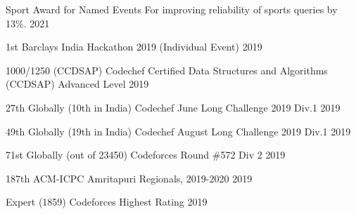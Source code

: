 \begin{cvhonors}

\cvhonor
{Sport Award for Named Events} %
{For improving reliability of sports queries by 13\%.} %
{} %
{2021} %


\cvhonor
{1st} %
{Barclays India Hackathon 2019 (Individual Event)} %
{} %
{2019} %


\cvhonor
{1000/1250 (CCDSAP)} %
{Codechef Certified Data Structures and Algorithms (CCDSAP) Advanced Level} %
{} %
{2019} %


\cvhonor
{27th Globally (10th in India)} %
{Codechef June Long Challenge 2019 Div.1} %
{} %
{2019} %


\cvhonor
{49th Globally (19th in India)} %
{Codechef August Long Challenge 2019 Div.1} %
{} %
{2019} %


\cvhonor
{71st Globally (out of 23450)} %
{Codeforces Round \#572 Div 2} %
{} %
{2019} %


\cvhonor
{187th} %
{ACM-ICPC Amritapuri Regionals, 2019-2020} %
{} %
{2019} %






\cvhonor
{Expert (1859)} %
{Codeforces Highest Rating} %
{} %
{2019} %



\end{cvhonors}
